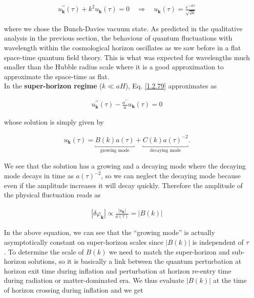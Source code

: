 \begin{align}
    u_{\mathbf{k}}^{\prime \prime}(\tau)+k^{2} u_{\mathbf{k}}(\tau)=0 \quad \Rightarrow \quad u_{\mathbf{k}}(\tau)=\frac{e^{-i k \tau}}{\sqrt{2 k}} \label{1.2.80}
\end{align}


where we chose the Bunch-Davies vacuum state. As predicted in the qualitative analysis in the previous section, the behaviour of quantum fluctuations with wavelength within the cosmological horizon oscillates as we saw before in a flat space-time quantum field theory. This is what was expected for wavelengths much smaller than the Hubble radius scale where it is a good approximation to approximate the space-time as flat.\\

In the \textbf{super-horizon regime} ($k \ll aH$), Eq. \eqref{1.2.79} approximates as

\begin{align}
    u_{\mathbf{k}}^{\prime \prime}(\tau)-\frac{a^{\prime \prime}}{a} u_{\mathbf{k}}(\tau)=0 \label{1.2.81}
\end{align}



whose solution is simply given by

\begin{align}
    u_{\mathbf{k}}(\tau)=\underbracket{B(k) a(\tau)}_{\text{growing mode}}+ \underbracket{C(k) a(\tau)^{-2}}_{\text{decaying mode}} .\label{1.2.82}
\end{align}

 We see that the solution has a growing and a decaying mode where the decaying mode decays in time as $a(\tau)^{-2}$, so we can neglect the decaying mode because even if the amplitude increases it will decay quickly. Therefore the amplitude of the physical fluctuation reads as

\begin{align}
    \left|\delta \varphi_{\mathbf{k}}\right| \propto \frac{\left|u_{\mathbf{k}}\right|}{a(\tau)}=|B(k)| \label{1.2.83}
\end{align}

In the above equation, we can see that the “growing
mode” is actually asymptotically constant on super-horizon scales since $|B(k)|$ is independent of $\tau$.
To determine the scale of $B(k)$ we need to match the super-horizon and sub-horizon solutions, so it is basically a link between the quantum perturbation at horizon exit time during inflation and perturbation at horizon re-entry time during radiation or matter-dominated era. We thus evaluate $|B(k)|$ at the time of horizon crossing during inflation and we get

